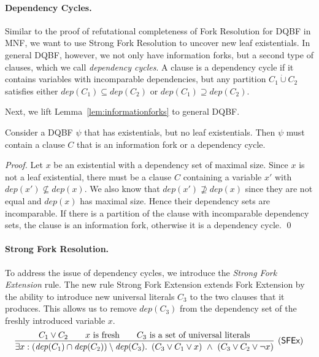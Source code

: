 \documentclass{svjour3}
\newcommand{\ldot}{\mathpunct{.}}
\newcommand{\dep}{\mathit{dep}}
\begin{document}
\paragraph{Dependency Cycles.}

Similar to the proof of refutational completeness of Fork Resolution for DQBF in MNF, we want to use Strong Fork Resolution to uncover new leaf existentials.
In general DQBF, however, we not only have information forks, but a second type of clauses, which we call \emph{dependency cycles}.
A clause is a dependency cycle if it contains variables with incomparable dependencies, but any partition $C_1\dot\cup C_2$ satisfies either $\dep(C_1) \subseteq \dep(C_2)$ or $\dep(C_1) \supseteq \dep(C_2)$.

Next, we lift Lemma~\ref{lem:informationforks} to general DQBF.

\begin{lemma}
\label{lem:dependencycycles}
Consider a DQBF $\psi$ that has existentials, but no leaf existentials.
Then $\psi$ must contain a clause $C$ that is an information fork or a dependency cycle.
\end{lemma}

\begin{proof}
Let $x$ be an existential with a dependency set of maximal size.
Since $x$ is not a leaf existential, there must be a clause $C$ containing a variable $x'$ with $\dep(x')\not\subseteq\dep(x)$.
We also know that $\dep(x')\not\supseteq\dep(x)$ since they are not equal and $\dep(x)$ has maximal size.
Hence their dependency sets are incomparable.
If there is a partition of the clause with incomparable dependency sets, the clause is an information fork, otherwise it is a dependency cycle.
\qed
\end{proof}


\paragraph{Strong Fork Resolution.}

To address the issue of dependency cycles, we introduce the \emph{Strong Fork Extension} rule.
The new rule Strong Fork Extension extends Fork Extension by the ability to introduce new universal literals $C_3$ to the two clauses that it produces. 
This allows us to remove $\dep(C_3)$ from the dependency set of the freshly introduced variable $x$.
\begin{equation*}
  \infer[(\textsf{SFEx})]
  {
      \exists x : (\dep(C_1) \cap \dep(C_2)) \setminus \dep(C_3) \ldot~
      (C_3 \vee C_1 \vee x) ~\wedge~ (C_3 \vee C_2 \vee \neg x)
  }
  {
      C_1 \vee C_2 \qquad x \text{ is fresh} \qquad C_3 \text{ is a set of universal literals}
  }
\end{equation*}
\end{document}
